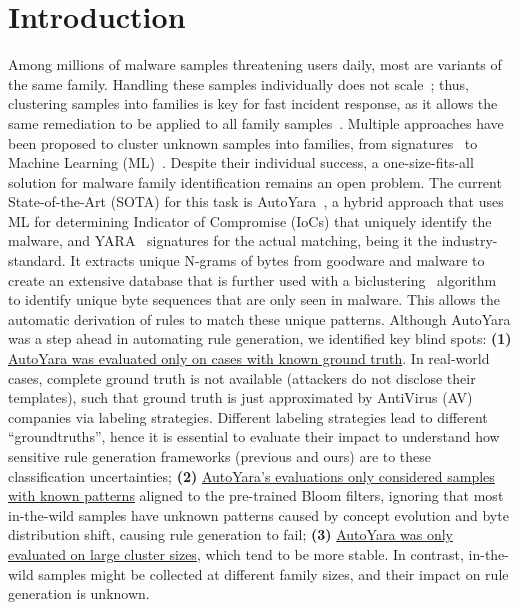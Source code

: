 
\section{Introduction}

\noindent Among millions of malware samples threatening users daily, most are variants of the same family. Handling these samples individually does not scale~\cite{miller2016_integration_performanc_measurement_malware_detection}; thus, clustering samples into families is key for fast incident response, as it allows the same remediation to be applied to all family samples~\cite{9223163,9141989}. Multiple approaches have been proposed to cluster unknown samples into families, from signatures~\cite{10.1007/978-3-540-70500-0_25} to Machine Learning (ML)~\cite{8376209}. Despite their individual success, a one-size-fits-all solution for malware family identification remains an open problem. The current State-of-the-Art (SOTA) for this task is AutoYara~\cite{raff2020_auto_yara}, a hybrid approach that uses ML for determining Indicator of Compromise (IoCs) that uniquely identify the malware, and YARA~\cite{yara} signatures for the actual matching, being it the industry-standard. It extracts unique N-grams of bytes from goodware and malware to create an extensive database that is further used with a biclustering~\cite{dhillon2001_spectralcoclustering} algorithm to identify unique byte sequences that are only seen in malware. This allows the automatic derivation of rules to match these unique patterns.
Although AutoYara was a step ahead in automating rule generation, we identified key blind spots: \textbf{(1)} \uline{AutoYara was evaluated only on cases with known ground truth}. In real-world cases, complete ground truth is not available (attackers do not disclose their templates), such that ground truth is just approximated by AntiVirus (AV) companies via labeling strategies. Different labeling strategies lead to different ``groundtruths'', hence it is essential to evaluate their impact to understand how sensitive rule generation frameworks (previous and ours) are to these classification uncertainties; \textbf{(2)} \uline{AutoYara's evaluations only considered samples with known patterns} aligned to the pre-trained Bloom filters, ignoring that most in-the-wild samples have unknown patterns caused by concept evolution and byte distribution shift, causing rule generation to fail; \textbf{(3)} \uline{AutoYara was only evaluated on large cluster sizes}, which tend to be more stable. In contrast, in-the-wild samples might be collected at different family sizes, and their impact on rule generation is unknown.



